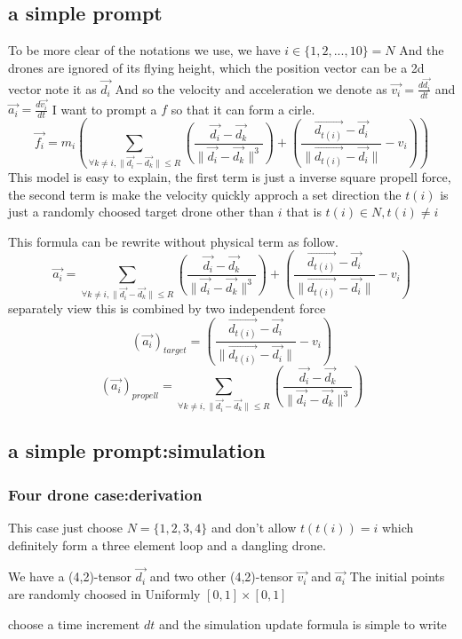 \documentclass{article}
\theoremstyle{definition} %
\begin{document}
\subsection{a simple prompt}
\label{sec:asimpleprompt}
To be more clear of the notations we use,
we have \(i\in\{1,2,...,10\}=N\)
And the drones are ignored of its flying
height, which the position vector can be a
2d vector note it as \(\vec{d_i}\)
And so the velocity and acceleration we denote as
\(\vec{v_i}=\frac{d\vec{d_i}}{dt}\)
and
\(\vec{a_i}=\frac{d\vec{v_i}}{dt}\)
I want to prompt a \(f\) so that it can form
a cirle.
\[
    \vec{f_i}=m_i(\sum_{\forall k\neq i,\|\vec{d_i}-\vec{d_k}\|\leq R}(\frac{\vec{d_i}-\vec{d_k}}{\|\vec{d_i}-\vec{d_k}\|^3})+(\frac{\vec{d_{t(i)}}-\vec{d_i}}{\|\vec{d_{t(i)}}-\vec{d_i}\|}-v_i))
\]
This model is easy to explain, the first term is
just a inverse square propell force, the second
term is make the velocity quickly approch a set direction
the \(t(i)\) is just a randomly choosed target drone
other than \(i\) that is \(t(i)\in N, t(i)\neq i\)

This formula can be rewrite without physical term as
follow.
\[
    \vec{a_i}=\sum_{\forall k\neq i,\|\vec{d_i}-\vec{d_k}\|\leq R}(\frac{\vec{d_i}-\vec{d_k}}{\|\vec{d_i}-\vec{d_k}\|^3})+(\frac{\vec{d_{t(i)}}-\vec{d_i}}{\|\vec{d_{t(i)}}-\vec{d_i}\|}-v_i)
\]
separately view this is combined by two independent force
\[
    (\vec{a_i})_{target}=(\frac{\vec{d_{t(i)}}-\vec{d_i}}{\|\vec{d_{t(i)}}-\vec{d_i}\|}-v_i)
\]
\[
    (\vec{a_i})_{propell}=\sum_{\forall k\neq i,\|\vec{d_i}-\vec{d_k}\|\leq R}(\frac{\vec{d_i}-\vec{d_k}}{\|\vec{d_i}-\vec{d_k}\|^3})
\]

\subsection{a simple prompt:simulation}
\subsubsection{Four drone case:derivation}
This case just choose \(N=\{1,2,3,4\}\)
and don't allow \(t(t(i))=i\)
which definitely form a three element loop and
a dangling drone.

We have a (4,2)-tensor \(\vec{d_i}\)
and two other (4,2)-tensor \(\vec{v_i}\)
and \(\vec{a_i}\)
The initial points are randomly choosed
in Uniformly \([0,1]\times[0,1]\)

choose a time increment \(dt\)
and the simulation update formula is simple to write
\end{document}
